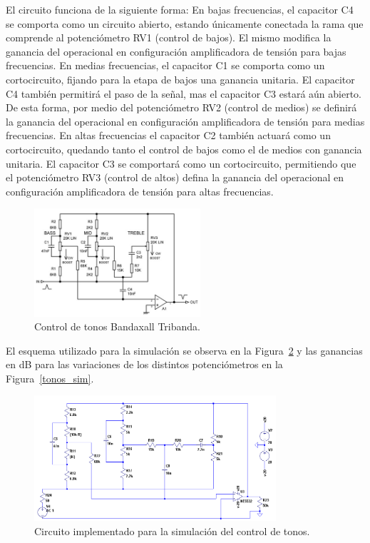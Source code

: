 El circuito funciona de la siguiente forma: 
En bajas frecuencias, el capacitor C4 se comporta como un circuito abierto, estando únicamente conectada la rama que comprende al potenciómetro RV1 (control de bajos). El mismo modifica la ganancia del operacional en configuración amplificadora de tensión para bajas frecuencias.
En medias frecuencias, el capacitor C1 se comporta como un cortocircuito, fijando para la etapa de bajos una ganancia unitaria. El capacitor C4 también permitirá el paso de la señal, mas el capacitor C3 estará aún abierto. De esta forma, por medio del potenciómetro RV2 (control de medios) se definirá la ganancia del operacional en configuración amplificadora de tensión para medias frecuencias.
En altas frecuencias el capacitor C2 también actuará como un cortocircuito, quedando tanto el control de bajos como el de medios con ganancia unitaria. El capacitor C3 se comportará como un cortocircuito, permitiendo que el potenciómetro RV3 (control de altos) defina la ganancia del operacional en configuración amplificadora de tensión para altas frecuencias.

\begin{figure}[H]
\centering
\includegraphics[width=0.55\textwidth]{img/ctrl_tonos.png}
\caption{Control de tonos Bandaxall Tribanda.}
\label{ctrl_tonos} 
\end{figure}

El esquema utilizado para la simulación se observa en la Figura~\ref{ctrl_tonos_cir} y las ganancias en dB para las variaciones de los distintos potenciómetros en la Figura~\ref{tonos_sim}.

\begin{figure}[H]
\centering
\includegraphics[width=0.8\textwidth]{img/ctrl_tonos_cir.png}
\caption{Circuito implementado para la simulación del control de tonos.}
\label{ctrl_tonos_cir} 
\end{figure}

